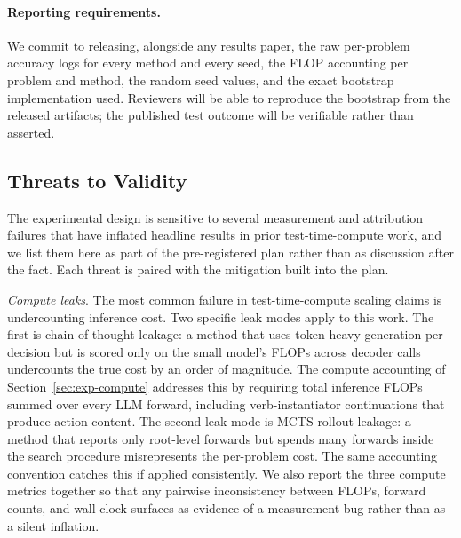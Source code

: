 \paragraph{Reporting requirements.}
We commit to releasing, alongside any results paper, the raw
per-problem accuracy logs for every method and every seed, the FLOP
accounting per problem and method, the random seed values, and the
exact bootstrap implementation used. Reviewers will be able to
reproduce the bootstrap from the released artifacts; the published
test outcome will be verifiable rather than asserted.

\subsection{Threats to Validity}
\label{sec:exp-threats}

The experimental design is sensitive to several measurement and
attribution failures that have inflated headline results in prior
test-time-compute work, and we list them here as part of the
pre-registered plan rather than as discussion after the fact. Each
threat is paired with the mitigation built into the plan.

\textit{Compute leaks}. The most common failure in test-time-compute
scaling claims is undercounting inference cost. Two specific leak
modes apply to this work. The first is chain-of-thought leakage: a
method that uses token-heavy generation per decision but is scored
only on the small model's FLOPs across decoder calls undercounts the
true cost by an order of magnitude. The compute accounting of
Section~\ref{sec:exp-compute} addresses this by requiring total
inference FLOPs summed over every LLM forward, including
verb-instantiator continuations that produce action content. The
second leak mode is MCTS-rollout leakage: a method that reports only
root-level forwards but spends many forwards inside the search
procedure misrepresents the per-problem cost. The same accounting
convention catches this if applied consistently. We also report the
three compute metrics together so that any pairwise inconsistency
between FLOPs, forward counts, and wall clock surfaces as evidence of
a measurement bug rather than as a silent inflation.


